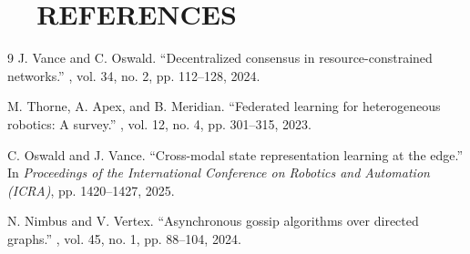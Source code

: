 \section{\texorpdfstring{\faBook\ \ }{ }REFERENCES}
\begin{thebibliography}{9}
    J. Vance and C. Oswald.
    \newblock ``Decentralized consensus in resource-constrained networks.''
    , vol. 34, no. 2, pp. 112--128, 2024.

    M. Thorne, A. Apex, and B. Meridian.
    \newblock ``Federated learning for heterogeneous robotics: A survey.''
    , vol. 12, no. 4, pp. 301--315, 2023.

    C. Oswald and J. Vance.
    \newblock ``Cross-modal state representation learning at the edge.''
    \newblock In {\em Proceedings of the International Conference on Robotics and Automation (ICRA)}, pp. 1420--1427, 2025.

    N. Nimbus and V. Vertex.
    \newblock ``Asynchronous gossip algorithms over directed graphs.''
    , vol. 45, no. 1, pp. 88--104, 2024.
\end{thebibliography}
